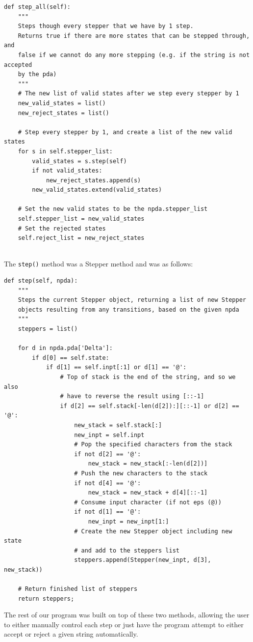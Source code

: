 \documentclass[a4paper]{article}
\begin{document}
\begin{verbatim}
def step_all(self):
    """
    Steps though every stepper that we have by 1 step.
    Returns true if there are more states that can be stepped through, and
    false if we cannot do any more stepping (e.g. if the string is not accepted
    by the pda)
    """
    # The new list of valid states after we step every stepper by 1
    new_valid_states = list()
    new_reject_states = list()

    # Step every stepper by 1, and create a list of the new valid states
    for s in self.stepper_list:
        valid_states = s.step(self)
        if not valid_states:
            new_reject_states.append(s)
        new_valid_states.extend(valid_states)

    # Set the new valid states to be the npda.stepper_list
    self.stepper_list = new_valid_states
    # Set the rejected states
    self.reject_list = new_reject_states
\end{verbatim}

\noindent
\\The \texttt{step()} method was a Stepper method and was as follows:\\

\begin{verbatim}
def step(self, npda):
    """
    Steps the current Stepper object, returning a list of new Stepper
    objects resulting from any transitions, based on the given npda
    """
    steppers = list()

    for d in npda.pda['Delta']:
        if d[0] == self.state:
            if d[1] == self.inpt[:1] or d[1] == '@':
                # Top of stack is the end of the string, and so we also
                # have to reverse the result using [::-1]
                if d[2] == self.stack[-len(d[2]):][::-1] or d[2] == '@':
                    new_stack = self.stack[:]
                    new_inpt = self.inpt
                    # Pop the specified characters from the stack
                    if not d[2] == '@':
                        new_stack = new_stack[:-len(d[2])]
                    # Push the new characters to the stack
                    if not d[4] == '@':
                        new_stack = new_stack + d[4][::-1]
                    # Consume input character (if not eps (@))
                    if not d[1] == '@':
                        new_inpt = new_inpt[1:]
                    # Create the new Stepper object including new state
                    # and add to the steppers list
                    steppers.append(Stepper(new_inpt, d[3], new_stack))

    # Return finished list of steppers
    return steppers;
\end{verbatim}

The rest of our program was built on top of these two methods, allowing the
user to either manually control each step or just have the program attempt to
either accept or reject a given string automatically.
\end{document}
